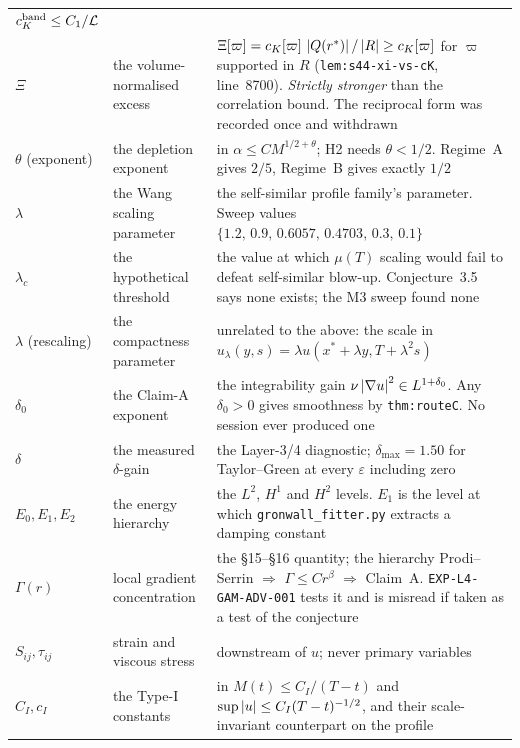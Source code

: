 {\begin{longtable}{@{}l p{} p{}@{}}
  \(c_K^{\mathrm{band}}\le C_1/\mathcal{L}\) \\
\(\Xi\) & the volume-normalised excess & \(\Xi[\varpi]=c_K[\varpi]\,
  \left|Q(r^{*})\right|/\left|R\right|\ge c_K[\varpi]\) for \(\varpi\) supported in \(R\)
  (\texttt{lem:s44-xi-vs-cK}, line~8700). \emph{Strictly stronger} than the
  correlation bound. The reciprocal form was recorded once and withdrawn \\
\(\theta\) (exponent) & the depletion exponent & in
  \(\alpha\le CM^{1/2+\theta}\); H2 needs \(\theta<1/2\). Regime~A gives
  \(2/5\), Regime~B gives exactly \(1/2\) \\
\(\lambda\) & the Wang scaling parameter & the self-similar profile family's
  parameter. Sweep values \(\{1.2,\,0.9,\,0.6057,\,0.4703,\,0.3,\,0.1\}\) \\
\(\lambda_c\) & the hypothetical threshold & the value at which \(\mu(T)\)
  scaling would fail to defeat self-similar blow-up. Conjecture~3.5 says none
  exists; the M3 sweep found none \\
\(\lambda\) (rescaling) & the compactness parameter & unrelated to the above:
  the scale in \(u_\lambda(y,s)=\lambda u(x^*+\lambda y,T+\lambda^2s)\) \\
\(\delta_0\) & the Claim-A exponent & the integrability gain
  \(\nu\left|\nabla u\right|^2\in L^{1+\delta_0}\). Any \(\delta_0>0\) gives
  smoothness by \texttt{thm:routeC}. No session ever produced one \\
\(\delta\) & the measured \(\delta\)-gain & the Layer-3/4 diagnostic;
  \(\delta_{\max}=1.50\) for Taylor--Green at every \(\varepsilon\) including
  zero \\
\(E_0,E_1,E_2\) & the energy hierarchy & the \(L^2\), \(H^1\) and \(H^2\)
  levels. \(E_1\) is the level at which \texttt{gronwall\_fitter.py} extracts
  a damping constant \\
\(\Gamma(r)\) & local gradient concentration & the \S15--\S16 quantity; the
  hierarchy Prodi--Serrin \(\Rightarrow\) \(\Gamma\le Cr^\beta\)
  \(\Rightarrow\) Claim~A. \texttt{EXP-L4-GAM-ADV-001} tests it and is
  misread if taken as a test of the conjecture \\
\(S_{ij},\tau_{ij}\) & strain and viscous stress & downstream of \(u\); never
  primary variables \\
\(C_I,c_I\) & the Type-I constants & in \(M(t)\le C_I/(T-t)\) and
  \(\sup\left|u\right|\le C_I(T-t)^{-1/2}\), and their scale-invariant counterpart on
  the profile \\
\end{longtable}}

